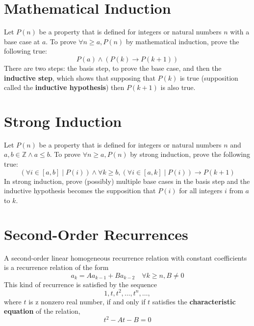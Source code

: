 \documentclass[11pt]{article}
\begin{document}
\section{Mathematical Induction}
	Let $P(n)$ be a property that is defined for integers or natural numbers $n$ with a base case at $a$. To prove $\forall n \geq a, P(n)$ by mathematical induction, prove the following true:
	\begin{equation}
		P(a) \wedge ( P(k) \rightarrow P(k + 1) )
	\end{equation}
	There are two steps: the basis step, to prove the base case, and then the \textbf{inductive step}, which shows that supposing that $P(k)$ is true (supposition called the \textbf{inductive hypothesis}) then $P(k + 1)$ is also true.
	
\section{Strong Induction}
	Let $P(n)$ be a property that is defined for integers or natural numbers $n$ and $a, b \in \mathbb{Z} \wedge a \leq b$. To prove $\forall n \geq a, P(n)$ by strong induction, prove the following true:
	\begin{equation}
		(\forall i\in[a, b] \mid P(i)) \wedge \forall k \geq b, (\forall i \in [a, k] \mid P(i)) \rightarrow P(k+1)
	\end{equation}
	In strong induction, prove (possibly) multiple base cases in the basis step and the inductive hypothesis becomes the supposition that $P(i)$ for all integers $i$ from $a$ to $k$.

\section{Second-Order Recurrences}
	A second-order linear homogeneous recurrence relation with constant coefficients is a recurrence relation of the form
	\begin{equation}
		a_k = A a_{k-1} + B a_{k-2} \quad \forall k \geq n, B \neq 0
	\end{equation}
	This kind of recurrence is satisfied by the sequence
	\begin{equation}
		1, t, t^2, \ldots, t^n, \ldots,
	\end{equation}
	where $t$ is z nonzero real number, if and only if $t$ satisfies the \textbf{characteristic equation} of the relation,
	\begin{equation}
		t^2 - At - B = 0
	\end{equation}
	
\end{document}
